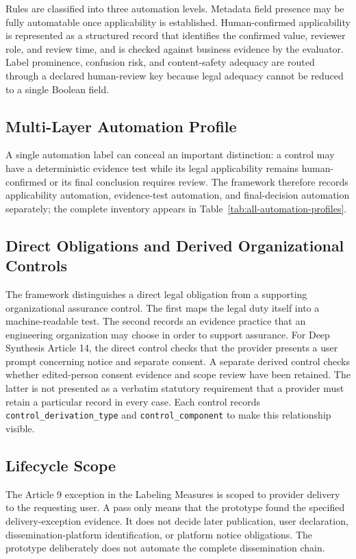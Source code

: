 \documentclass[10pt,journal]{IEEEtran}
\begin{document}
Rules are classified into three automation levels. Metadata field presence may be fully automatable once applicability is established. Human-confirmed applicability is represented as a structured record that identifies the confirmed value, reviewer role, and review time, and is checked against business evidence by the evaluator. Label prominence, confusion risk, and content-safety adequacy are routed through a declared human-review key because legal adequacy cannot be reduced to a single Boolean field.

\subsection{Multi-Layer Automation Profile}

A single automation label can conceal an important distinction: a control may have a deterministic evidence test while its legal applicability remains human-confirmed or its final conclusion requires review. The framework therefore records applicability automation, evidence-test automation, and final-decision automation separately; the complete inventory appears in Table~\ref{tab:all-automation-profiles}.

\subsection{Direct Obligations and Derived Organizational Controls}

The framework distinguishes a direct legal obligation from a supporting organizational assurance control. The first maps the legal duty itself into a machine-readable test. The second records an evidence practice that an engineering organization may choose in order to support assurance. For Deep Synthesis Article 14, the direct control checks that the provider presents a user prompt concerning notice and separate consent. A separate derived control checks whether edited-person consent evidence and scope review have been retained. The latter is not presented as a verbatim statutory requirement that a provider must retain a particular record in every case. Each control records \texttt{control\_derivation\_type} and \texttt{control\_component} to make this relationship visible.

\subsection{Lifecycle Scope}

The Article 9 exception in the Labeling Measures is scoped to provider delivery to the requesting user. A pass only means that the prototype found the specified delivery-exception evidence. It does not decide later publication, user declaration, dissemination-platform identification, or platform notice obligations. The prototype deliberately does not automate the complete dissemination chain.
\end{document}
